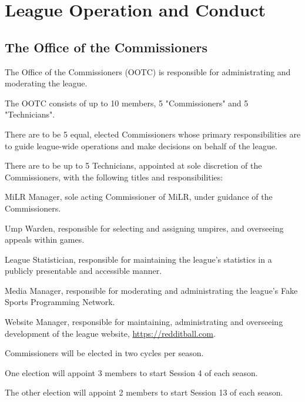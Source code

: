 
\section{League Operation and Conduct}

\subsection{The Office of the Commissioners}
\begin{deepEnumerate}
	\item The Office of the Commissioners (OOTC) is responsible for administrating and moderating the league.
	\item The OOTC consists of up to 10 members, 5 "Commissioners" and 5 "Technicians".
	\begin{deepEnumerate}
		\item There are to be 5 equal, elected Commissioners whose primary responsibilities are to guide league-wide operations and make decisions on behalf of the league.
		\item There are to be up to 5 Technicians, appointed at sole discretion of the Commissioners, with the following titles and responsibilities:
		\begin{deepEnumerate}
			\item MiLR Manager, sole acting Commissioner of MiLR, under guidance of the Commissioners.
			\item Ump Warden, responsible for selecting and assigning umpires, and overseeing appeals within games.
			\item League Statistician, responsible for maintaining the league's statistics in a publicly presentable and accessible manner.
			\item Media Manager, responsible for moderating and administrating the league's Fake Sports Programming Network.
			\item Website Manager, responsible for maintaining, administrating and overseeing development of the league website, \url{https://redditball.com}.
		\end{deepEnumerate}
	\end{deepEnumerate}
	\item Commissioners will be elected in two cycles per season.
	\begin{deepEnumerate}
		\item One election will appoint 3 members to start Session 4 of each season.
		\item The other election will appoint 2 members to start Session 13 of each season.

\end{deepEnumerate}
\end{deepEnumerate}
